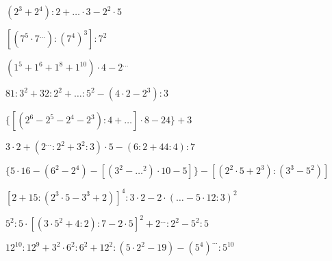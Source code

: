 \begin{esercizio} %
\((2^3+2^4):2+{\dots}\cdot3-2^2\cdot5\) 
\end{esercizio}
\begin{esercizio} %
\([(7^5\cdot7^{\dots}):(7^4)^3]:7^2\) 
\end{esercizio}
\begin{esercizio} %
\((1^5+1^6+1^8+1^{10})\cdot4-2^{\dots}\) 
\end{esercizio}
\begin{esercizio} %
\(81:3^2+32:2^2+{\dots}:5^2-(4\cdot2-2^3):3\) 
\end{esercizio}
\begin{esercizio} %
\(\{[(2^6-2^5-2^4-2^3):4+{\dots}]\cdot8-24\}+3\) 
\end{esercizio}
\begin{esercizio} %
\(3\cdot2+(2^{\dots}:2^2+3^2:3)\cdot5-(6:2+44:4):7\) 
\end{esercizio}
\begin{esercizio} %
\(\{5\cdot16-(6^2-2^4)-[(3^2-{\dots}^2)\cdot10-5]\}-[(2^2\cdot5+2^3):(3^3-5^2)
]\) 
\end{esercizio}
\begin{esercizio} %
\([2+15:(2^3\cdot5-3^3+2)]^4:3\cdot2-2\cdot({\dots}-5\cdot12:3)^2\) 
\end{esercizio}
\begin{esercizio} %
\(5^2:5\cdot[(3\cdot5^2+4:2):7-2\cdot5]^2+2^{\dots}:2^2-5^2:5\) 
\end{esercizio}
\begin{esercizio} %
\(12^{10}:12^9+3^2\cdot6^2:6^2+12^2:(5\cdot2^2-19)-(5^4)^{\dots}:5^{10}\)
\end{esercizio}
